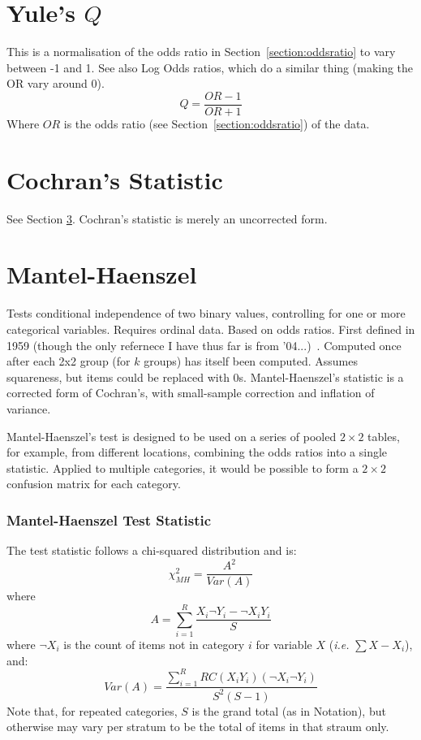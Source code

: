 \documentclass[11pt]{article}
\begin{document}
\section{Yule's $Q$}
This is a normalisation of the odds ratio in Section~\ref{section:oddsratio} to vary between -1 and 1.  See also Log Odds ratios, which do a similar thing (making the OR vary around 0).
$$
Q = \frac{OR - 1}{OR + 1}
$$
Where $OR$ is the odds ratio (see Section~\ref{section:oddsratio}) of the data.
















\section{Cochran's Statistic}
See Section \ref{section:mantelhaenszel}.  Cochran's statistic is merely an uncorrected form.

\section{Mantel-Haenszel}
\label{section:mantelhaenszel}
Tests conditional independence of two binary values, controlling for one or more categorical variables.  Requires ordinal data.  Based on odds ratios.  First defined in 1959 {\color{red} (though the only refernece I have thus far is from '04...)}~\cite{mantel2004statistical}.  Computed once after each 2x2 group (for $k$ groups) has itself been computed.  Assumes squareness, but items could be replaced with 0s.
Mantel-Haenszel's statistic is a corrected form of Cochran's, with small-sample correction and inflation of variance.

Mantel-Haenszel's test is designed to be used on a series of pooled $2\times 2$ tables, for example, from different locations, combining the odds ratios into a single statistic.  Applied to multiple categories, it would be possible to form a $2\times 2$ confusion matrix for each category.

\subsubsection{Mantel-Haenszel Test Statistic}
The test statistic follows a chi-squared distribution and is:
$$
\chi^2_{MH} = \frac{ A^2 }{ Var(A) }
$$
where
$$
A = \sum_{i=1}^{R}{  \frac{  X_i ¬Y_i  -  ¬X_i Y_i }{ S }  }
$$
where $¬X_i$ is the count of items not in category $i$ for variable $X$ (\textsl{i.e.} $\sum{X} - X_i$), and:
$$
Var(A) = \frac{   \sum_{i=1}^{R}{  R C (X_i Y_i) (¬X_i ¬Y_i) }  }{  S^2(S - 1)  }
$$
Note that, for repeated categories, $S$ is the grand total (as in Notation), but otherwise may vary per stratum to be the total of items in that straum only.
\end{document}
